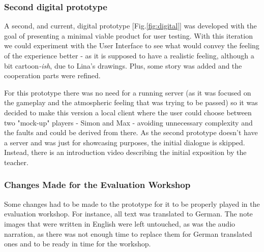 \subsubsection{Second digital prototype} A second, and current, digital prototype [Fig.\ref{fig:digital}] was developed with the goal of presenting a minimal viable product for user testing. With this iteration we could experiment with the User Interface to see what would convey the feeling of the experience better - as it is supposed to have a realistic feeling, although a bit cartoon\textit{-ish}, due to Lina's drawings. Plus, some story was added and the cooperation parts were refined. 
\par For this prototype there was no need for a running server (as it was focused on the gameplay and the atmospheric feeling that was trying to be passed) so it was decided to make this version a local client where the user could choose between two "mock-up" players - Simon and Max - avoiding unnecessary complexity and the faults and could be derived from there. As the second prototype doesn't have a server and was just for showcasing purposes, the initial dialogue is skipped. Instead, there is an introduction video describing the initial exposition by the teacher.


\subsubsection{Changes Made for the Evaluation Workshop}

\par Some changes had to be made to the prototype for it to be properly played in the evaluation workshop. For instance, all text was translated to German. The note images that were written in English were left untouched, as was the audio narration, as there was not enough time to replace them for German translated ones and to be ready in time for the workshop.
